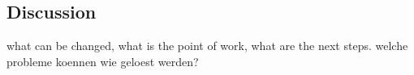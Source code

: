 \subsection{Discussion}
what can be changed, what is the point of work, what are the next steps. welche probleme koennen wie geloest werden?